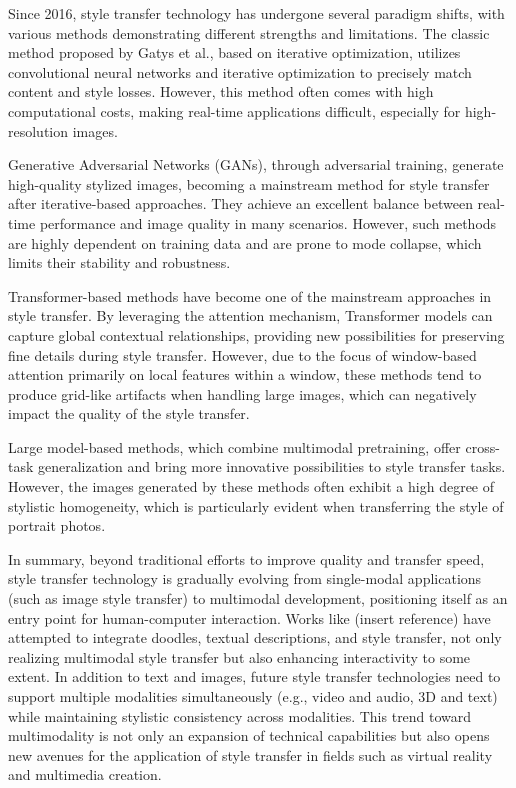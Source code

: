 \documentclass[preprint,12pt]{elsarticle}
\begin{document}
Since 2016, style transfer technology has undergone several paradigm shifts, with various methods demonstrating different strengths and limitations. The classic method proposed by Gatys et al., based on iterative optimization, utilizes convolutional neural networks and iterative optimization to precisely match content and style losses. However, this method often comes with high computational costs, making real-time applications difficult, especially for high-resolution images.

Generative Adversarial Networks (GANs), through adversarial training, generate high-quality stylized images, becoming a mainstream method for style transfer after iterative-based approaches. They achieve an excellent balance between real-time performance and image quality in many scenarios. However, such methods are highly dependent on training data and are prone to mode collapse, which limits their stability and robustness.

Transformer-based methods have become one of the mainstream approaches in style transfer. By leveraging the attention mechanism, Transformer models can capture global contextual relationships, providing new possibilities for preserving fine details during style transfer. However, due to the focus of window-based attention primarily on local features within a window, these methods tend to produce grid-like artifacts when handling large images, which can negatively impact the quality of the style transfer.

Large model-based methods, which combine multimodal pretraining, offer cross-task generalization and bring more innovative possibilities to style transfer tasks. However, the images generated by these methods often exhibit a high degree of stylistic homogeneity, which is particularly evident when transferring the style of portrait photos.

In summary, beyond traditional efforts to improve quality and transfer speed, style transfer technology is gradually evolving from single-modal applications (such as image style transfer) to multimodal development, positioning itself as an entry point for human-computer interaction. Works like (insert reference) have attempted to integrate doodles, textual descriptions, and style transfer, not only realizing multimodal style transfer but also enhancing interactivity to some extent. In addition to text and images, future style transfer technologies need to support multiple modalities simultaneously (e.g., video and audio, 3D and text) while maintaining stylistic consistency across modalities. This trend toward multimodality is not only an expansion of technical capabilities but also opens new avenues for the application of style transfer in fields such as virtual reality and multimedia creation.
\end{document}

